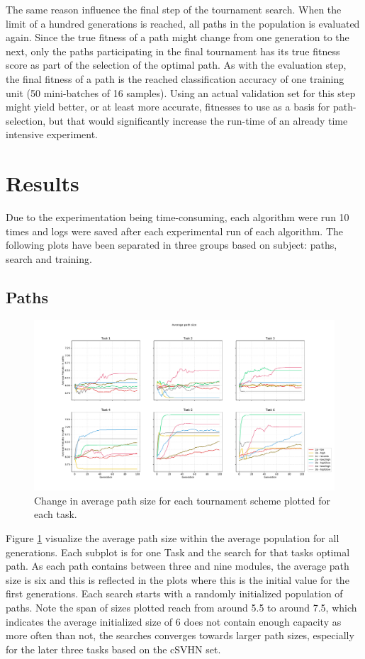 The same reason influence the final step of the tournament search. When the limit of a hundred generations is reached, all paths in the population is evaluated again. Since the true fitness of a path might change from one generation to the next, only the paths participating in the final tournament has its true fitness score as part of the selection of the optimal path. As with the evaluation step, the final fitness of a path is the reached classification accuracy of one training unit (50 mini-batches of 16 samples). Using an actual validation set for this step might yield better, or at least more accurate, fitnesses to use as a basis for path-selection, but that would significantly increase the run-time of an already time intensive experiment. 

\section{Results}\label{Search-results}
Due to the experimentation being time-consuming, each algorithm were run 10 times and logs were saved after each experimental run of each algorithm. The following plots have been separated in three groups based on subject: paths, search and training. 

\subsection{Paths}
\begin{figure}[p!]%
    \includegraphics[width=\textwidth]{Chapters/Experiments/search_algo/figures/Average_path_size.pdf}
    \caption{Change in average path size for each tournament scheme plotted for each task.}
    \label{fig:search.avg_path_size}
\end{figure}

Figure \ref{fig:search.avg_path_size} visualize the average path size within the average population for all generations. Each subplot is for one Task and the search for that tasks optimal path. As each path contains between three and nine modules, the average path size is six and this is reflected in the plots where this is the initial value for the first generations. Each search starts with a randomly initialized population of paths. Note the span of sizes plotted reach from around 5.5 to around 7.5, which indicates the average initialized size of 6 does not contain enough capacity as more often than not, the searches converges towards larger path sizes, especially for the later three tasks based on the cSVHN set. 

